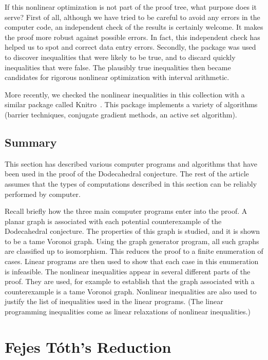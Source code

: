 \documentclass{article} %
\begin{document}
If this nonlinear optimization is not part of the proof tree, what
purpose does it serve? First of all, although we have tried to be
careful to avoid any errors in the computer code, an independent check
of the results is certainly welcome. It makes the proof more robust
against possible errors. In fact, this independent check has helped us
to spot and correct data entry errors. Secondly, the package was used
to discover inequalities that were likely to be true, and to discard
quickly inequalities that were false. The plausibly true inequalities
then became candidates for rigorous nonlinear optimization with
interval arithmetic.

More recently, we checked the nonlinear inequalities in this
collection with a similar package called Knitro~\cite{Byrd:2006:LSNO}.
This package implements a variety of algorithms (barrier techniques,
conjugate gradient methods, an active set algorithm).

\subsection{Summary}

This section has described various computer programs and algorithms
that have been used in the proof of the Dodecahedral conjecture. The
rest of the article assumes that the types of computations described
in this section can be reliably performed by computer.

Recall briefly how the three main computer programs enter into the
proof. A planar graph is associated with each potential counterexample
of the Dodecahedral conjecture. The properties of this graph is
studied, and it is shown to be a tame Voronoi graph. Using the graph
generator program, all such graphs are classified up to isomorphism.
This reduces the proof to a finite enumeration of cases. Linear
programs are then used to show that each case in this enumeration is
infeasible. The nonlinear inequalities appear in several different
parts of the proof. They are used, for example to establish that the
graph associated with a counterexample is a tame Voronoi graph.
Nonlinear inequalities are also used to justify the list of
inequalities used in the linear programs. (The linear programming
inequalities come as linear relaxations of nonlinear inequalities.)

\section{Fejes T\'oth's Reduction}\label{sec:12sphere}
\end{document}
